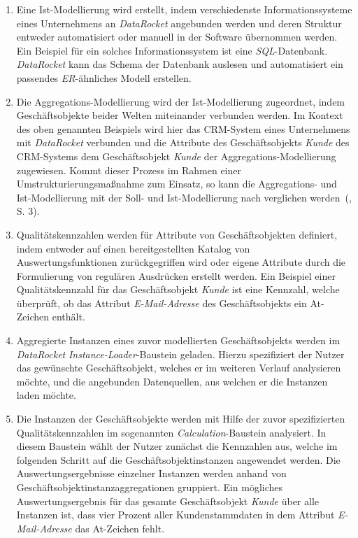 \documentclass[
  language=german, %
  type=bachelor,%
  ngerman
]{isthesis}
\begin{document}
\begin{content}
\begin{enumerate}
    \item Eine Ist-Modellierung wird erstellt, indem verschiedenste
      Informationssysteme eines Unternehmens an \textit{DataRocket} angebunden
      werden und deren Struktur entweder automatisiert oder manuell in der
			Software übernommen werden. Ein Beispiel für ein solches
			Informationssystem ist eine \textit{SQL}-Datenbank. \textit{DataRocket}
			kann das Schema der Datenbank auslesen und automatisiert ein passendes
			\textit{\acrshort{ER}}-ähnliches Modell erstellen.

		\item Die Aggregations-Modellierung wird der Ist-Modellierung zugeordnet,
		indem Geschäftsobjekte beider Welten miteinander verbunden werden. Im
		Kontext des oben genannten Beispiels wird hier das \acrshort{CRM}-System
		eines Unternehmens mit \textit{DataRocket} verbunden und die Attribute des
		Geschäftsobjekts \textit{Kunde} des \acrshort{CRM}-Systems dem
		Geschäftsobjekt \textit{Kunde} der Aggregations-Modellierung zugewiesen.
		Kommt dieser Prozess \zB{} im Rahmen einer Umstrukturierungsmaßnahme
		zum Einsatz, so kann die Aggregations- und Ist-Modellierung mit der Soll-
		und Ist-Modellierung nach \textsc{\citeauthor{becker2006konzeptionelle}}
		verglichen werden~(\citeyear{becker2006konzeptionelle}, S. 3).

		\item Qualitätskennzahlen werden für Attribute von Geschäftsobjekten
		definiert, indem entweder auf einen bereitgestellten Katalog von
		Auswertungsfunktionen zurückgegriffen wird oder eigene Attribute durch die
		Formulierung von regulären Ausdrücken erstellt werden. Ein Beispiel einer
		Qualitätskennzahl für das Geschäftsobjekt \textit{Kunde} ist eine Kennzahl,
		welche überprüft, ob das Attribut \textit{E-Mail-Adresse} des
		Geschäftsobjekts ein At-Zeichen enthält.

		\item Aggregierte Instanzen eines zuvor modellierten Geschäftsobjekts
		werden im \textit{DataRocket} \textit{Instance-Loader}-Baustein geladen.
		Hierzu spezifiziert der Nutzer das gewünschte Geschäftsobjekt, welches er
		im weiteren Verlauf analysieren möchte, und die angebunden Datenquellen,
		aus welchen er die Instanzen laden möchte.

		\item Die Instanzen der Geschäftsobjekte werden mit Hilfe der zuvor
		spezifizierten Qualitätskennzahlen im sogenannten
		\textit{Calculation}-Baustein analysiert. In diesem Baustein wählt der
		Nutzer zunächst die Kennzahlen aus, welche im folgenden Schritt auf die
		Geschäftsobjektinstanzen angewendet werden. Die Auswertungsergebnisse
		einzelner Instanzen werden anhand von Geschäftsobjektinstanzaggregationen
		gruppiert. Ein mögliches Auswertungsergebnis für das gesamte
      Geschäftsobjekt \textit{Kunde} über alle Instanzen ist, dass vier Prozent aller
		Kundenstammdaten in dem Attribut \textit{E-Mail-Adresse} das At-Zeichen
		fehlt.


\end{enumerate}
\end{content}
\end{document}
